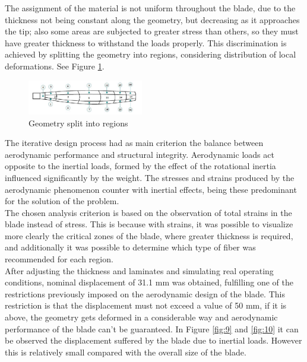 The assignment of the material is not uniform throughout the blade, due to the thickness not being constant along the geometry, but decreasing as it approaches the tip; also some areas are subjected to greater stress than others, so they must have greater thickness to withstand the loads properly. This discrimination is achieved by splitting the geometry into regions, considering distribution of local deformations. See Figure \ref{fig:8}.

\begin{figure}[H]
  \includegraphics[width=0.45\textwidth]{p1}
\caption{Geometry split into regions }
\label{fig:8}       %
\end{figure}
\vspace{-0.7cm}
The iterative design process had as main criterion the balance between aerodynamic performance and structural integrity. Aerodynamic loads act opposite to the inertial loads, formed by the effect of the rotational inertia influenced significantly by the weight. The stresses and strains produced by the aerodynamic phenomenon counter with inertial effects, being these predominant for the solution of the problem.\\

The chosen analysis criterion is based on the observation of total strains in the blade instead of stress. This is because with strains, it was possible to visualize more clearly the critical zones of the blade, where greater thickness is required, and additionally it was possible to determine which type of fiber was recommended for each region.\\

After adjusting the thickness and laminates and simulating real operating conditions, nominal displacement of 31.1 mm was obtained, fulfilling one of the restrictions previously imposed on the aerodynamic design of the blade. This restriction is that the displacement must not exceed a value of 50 mm, if it is above, the geometry gets deformed in a considerable way and aerodynamic performance of the blade can’t be guaranteed. In Figure \ref{fig:9} and \ref{fig:10} it can be observed the displacement suffered by the blade due to inertial loads. However this is relatively small compared with the overall size of the blade.


